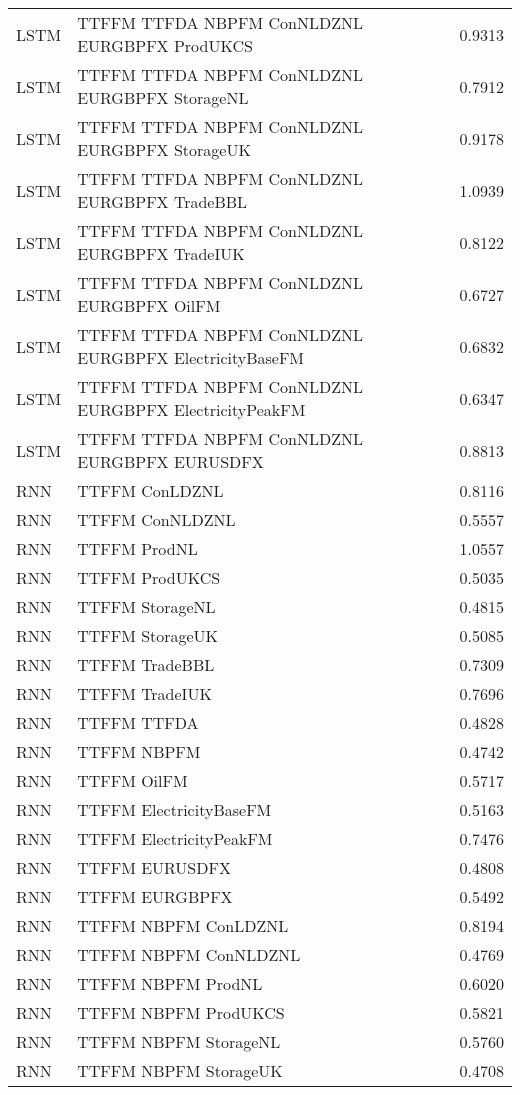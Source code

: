 \begin{table}[h!]
\begin{adjustbox}{max width=\textwidth}
\begin{tabular}{llr}
  LSTM & TTFFM TTFDA NBPFM ConNLDZNL EURGBPFX ProdUKCS & 0.9313 \\ 
  LSTM & TTFFM TTFDA NBPFM ConNLDZNL EURGBPFX StorageNL & 0.7912 \\ 
  LSTM & TTFFM TTFDA NBPFM ConNLDZNL EURGBPFX StorageUK & 0.9178 \\ 
  LSTM & TTFFM TTFDA NBPFM ConNLDZNL EURGBPFX TradeBBL & 1.0939 \\ 
  LSTM & TTFFM TTFDA NBPFM ConNLDZNL EURGBPFX TradeIUK & 0.8122 \\ 
  LSTM & TTFFM TTFDA NBPFM ConNLDZNL EURGBPFX OilFM & 0.6727 \\ 
  LSTM & TTFFM TTFDA NBPFM ConNLDZNL EURGBPFX ElectricityBaseFM & 0.6832 \\ 
  LSTM & TTFFM TTFDA NBPFM ConNLDZNL EURGBPFX ElectricityPeakFM & 0.6347 \\ 
  LSTM & TTFFM TTFDA NBPFM ConNLDZNL EURGBPFX EURUSDFX & 0.8813 \\ 
  RNN & TTFFM ConLDZNL & 0.8116 \\ 
  RNN & TTFFM ConNLDZNL & 0.5557 \\ 
  RNN & TTFFM ProdNL & 1.0557 \\ 
  RNN & TTFFM ProdUKCS & 0.5035 \\ 
  RNN & TTFFM StorageNL & 0.4815 \\ 
  RNN & TTFFM StorageUK & 0.5085 \\ 
  RNN & TTFFM TradeBBL & 0.7309 \\ 
  RNN & TTFFM TradeIUK & 0.7696 \\ 
  RNN & TTFFM TTFDA & 0.4828 \\ 
  RNN & TTFFM NBPFM & 0.4742 \\ 
  RNN & TTFFM OilFM & 0.5717 \\ 
  RNN & TTFFM ElectricityBaseFM & 0.5163 \\ 
  RNN & TTFFM ElectricityPeakFM & 0.7476 \\ 
  RNN & TTFFM EURUSDFX & 0.4808 \\ 
  RNN & TTFFM EURGBPFX & 0.5492 \\ 
  RNN & TTFFM NBPFM ConLDZNL & 0.8194 \\ 
  RNN & TTFFM NBPFM ConNLDZNL & 0.4769 \\ 
  RNN & TTFFM NBPFM ProdNL & 0.6020 \\ 
  RNN & TTFFM NBPFM ProdUKCS & 0.5821 \\ 
  RNN & TTFFM NBPFM StorageNL & 0.5760 \\ 
  RNN & TTFFM NBPFM StorageUK & 0.4708 \\ 

\end{tabular}
\end{adjustbox}
\end{table}
